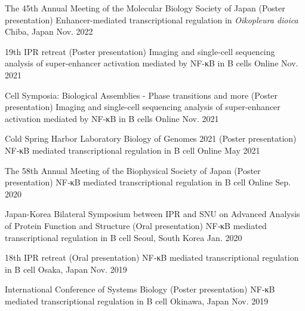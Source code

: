 \begin{cventries}


  \cventrypub
    {The 45th Annual Meeting of the Molecular Biology Society of Japan (Poster presentation)} %
    {Enhancer-mediated transcriptional regulation in \textit{Oikopleura dioica}} %
    {Chiba, Japan} %
    {Nov. 2022} %

  \cventrypub
    {19th IPR retreat (Poster presentation)} %
    {Imaging and single-cell sequencing analysis of super-enhancer activation mediated by NF-κB in B cells} %
    {Online} %
    {Nov. 2021} %

  \cventrypub
    {Cell Symposia: Biological Assemblies - Phase transitions and more (Poster presentation)} %
    {Imaging and single-cell sequencing analysis of super-enhancer activation mediated by NF-κB in B cells} %
    {Online} %
    {Nov. 2021} %

  \cventrypub
    {Cold Spring Harbor Laboratory Biology of Genomes 2021 (Poster presentation)} %
    {NF‑κB mediated transcriptional regulation in B cell} %
    {Online} %
    {May 2021} %

  \cventrypub
    {The 58th Annual Meeting of the Biophysical Society of Japan (Poster presentation)} %
    {NF‑κB mediated transcriptional regulation in B cell} %
    {Online} %
    {Sep. 2020} %

  \cventrypub
    {Japan-Korea Bilateral Symposium between IPR and SNU on Advanced Analysis of Protein Function and Structure (Oral presentation)} %
    {NF‑κB mediated transcriptional regulation in B cell} %
    {Seoul, South Korea} %
    {Jan. 2020} %

  \cventrypub
    {18th IPR retreat (Oral presentation)} %
    {NF‑κB mediated transcriptional regulation in B cell} %
    {Osaka, Japan} %
    {Nov. 2019} %

  \cventrypublast
    {International Conference of Systems Biology (Poster presentation)} %
    {NF‑κB mediated transcriptional regulation in B cell} %
    {Okinawa, Japan} %
    {Nov. 2019} %


\end{cventries}
  